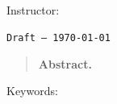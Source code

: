\thispagestyle{empty}
\markboth{\ThesisTitle}{\ThesisTitle}

\chaphead*[]{\ThesisTitle}

\vspace{-1.0em}

{\large\sffamily
\ThesisAuthor\par
}

\vspace{0.35em}

{\small\color{Gray40}\sffamily
\ReportType\ \textbullet\ \ReportCourse\ \textbullet\ \YearSubmitted\par
\ReportAffiliation\par
Instructor: \Supervisor\par
\ifWIP
    \texttt{Draft -- \today}\par
\fi
}

\vspace{1.1em}

\begin{quote}
\small
\noindent\textbf{Abstract. }\Abstract
\end{quote}

\vspace{0.2em}

{\small
\noindent\textcolor{Gray40}{\textsf{Keywords:}}\ \Keywords
\par
}

\vspace{1.1em}
